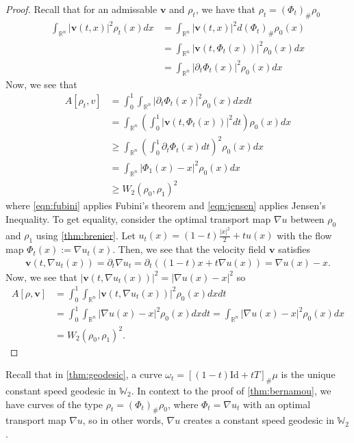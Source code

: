 \documentclass[12pt]{article}
\newcommand{\R}{\mathbb{R}}
\theoremstyle{plain}
\numberwithin{equation}{section}
\begin{document}
\begin{proof}
  Recall that for an admissable $\mathbf{v}$ and $\rho_t$, we have that $\rho_t = (\Phi_t)_\#\rho_0$
  \begin{align*}
		\int_{\mathbb{R}^n}|\mathbf{v}(t,x)|^2\rho_t(x)dx &= \int_{\mathbb{R}^n}|\mathbf{v}(t,x)|^2 d(\Phi_t)_\#\rho_0(x)\\
		&= \int_{\mathbb{R}^n}|\mathbf{v}(t,\Phi_t(x))|^2\rho_0(x)dx\\
    &= \int_{\mathbb{R}^n}|\partial_t\Phi_t(x)|^2\rho_0(x)dx
	\end{align*}
	Now, we see that 
	\begin{align}
		A[\rho_t,v] &= \int_0^1\int_{\mathbb{R}^n}|\partial_t\Phi_t(x)|^2\rho_0(x)dxdt \\
    &= \int_{\mathbb{R}^n}\left(\int_0^1|\mathbf{v}(t,\Phi_t(x))|^2dt\right)\rho_0(x)dx\label{eqn:fubini} \\
		&\ge \int_{\mathbb{R}^n}\left(\int_0^1\partial_t\Phi_t(x)dt\right)^2\rho_0(x)dx\label{eqn:jensen} \\
    &= \int_{\mathbb{R}^n}|\Phi_1(x) - x|^2\rho_0(x)dx\\
		& \ge W_2(\rho_0,\rho_1)^2
	\end{align}
  where \autoref{eqn:fubini} applies Fubini's theorem and \autoref{eqn:jensen} applies Jensen's Inequality.\newline
  To get equality, consider the optimal transport map $\nabla u$ between $\rho_0$ and $\rho_1$ using \autoref{thm:brenier}. Let $u_t(x) = (1-t)\frac{|x|^2}{2}+tu(x)$ with the flow map $\Phi_t(x) := \nabla u_t(x)$. 
  Then, we see that the velocity field $\mathbf{v}$ satisfies 
  \begin{align*}
    \mathbf{v}(t,\nabla u_t(x)) = \partial_t\nabla u_t = \partial_t((1-t)x + t\nabla u(x)) = \nabla u(x) - x.
  \end{align*}
  Now, we see that $|\mathbf{v}(t,\nabla u_t(x))|^2 = |\nabla u(x) - x|^2$ so 
  \begin{align*}
    A[\rho,\mathbf{v}] &= \int_0^1\int_{\R^n} |\mathbf{v}(t,\nabla u_t(x))|^2\rho_0(x)dxdt \\
    &= \int_0^1\int_{\R^n} |\nabla u(x) - x|^2\rho_0(x)dxdt = \int_{\R^n} |\nabla u(x) - x|^2\rho_0(x) dx \\
    &= W_2(\rho_0,\rho_1)^2.
  \end{align*}
\end{proof}
Recall that in \autoref{thm:geodesic}, a curve $\omega_t = \left[(1-t)\text{Id} + tT\right]_\#\mu$ is the unique constant speed geodesic in $\mathbb{W}_2$. In context to the proof of \autoref{thm:bernamou}, we have curves of the type $\rho_t = (\Phi_t)_\# \rho_0$, where $\Phi_t = \nabla u_t$ with an optimal transport map $\nabla u$, so in other words, $\nabla u$ creates a constant speed geodesic in $\mathbb{W}_2$.
\end{document}
